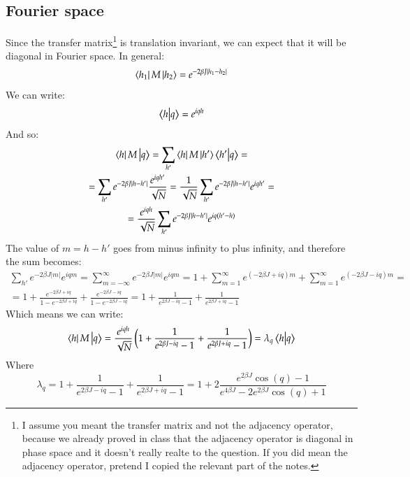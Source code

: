 \documentclass{article}
\begin{document}
\subsection{Fourier space}
Since the transfer matrix\footnote{I assume you meant the transfer matrix and not the adjacency operator, because we already proved in class that the adjacency operator is diagonal in phase space and it doesn't really realte to the question. If you did mean the adjacency operator, pretend I copied the relevant part of the notes.} is translation invariant, we can expect that it will be diagonal in Fourier space. In general:
\begin{equation}
    \bra{h_1}M\ket{h_2} = e^{-2\beta J|h_1 - h_2|}
\end{equation}
We can write:
\begin{equation}
    \bra{h}\ket{q} = e^{iqh}
\end{equation}
And so:
\begin{equation}
\begin{gathered}
    \bra{h}M\ket{q}
    = \sum_{h'} \bra{h}M\ket{h'}\bra{h'}\ket{q} = \\
    = \sum_{h'} e^{-2\beta J|h - h'|}\frac{e^{iqh'}}{\sqrt{N}}
    = \frac{1}{\sqrt{N}}\sum_{h'} e^{-2\beta J|h - h'|}e^{iqh'} = \\
    = \frac{e^{iqh}}{\sqrt{N}}\sum_{h'} e^{-2\beta J|h - h'|} e^{iq(h'-h)}
\end{gathered}
\end{equation}
The value of $m = h - h'$ goes from minus infinity to plus infinity, and therefore the sum becomes:
\begin{equation}
\begin{gathered}
    \sum_{h'} e^{-2\beta J|m|} e^{iqm} = \sum_{m=-\infty}^\infty e^{-2\beta J|m|} e^{iqm} = 1 + \sum_{m = 1}^{\infty}e^{(-2\beta J + iq)m} + \sum_{m = 1}^{\infty}e^{(-2\beta J - iq)m} = \\
    = 1 + \frac{e^{-2\beta J + iq}}{1 - e^{-2\beta J + iq}} + \frac{e^{-2\beta J - iq}}{1 - e^{-2\beta J - iq}} = 1 + \frac{1}{e^{2\beta J - iq} - 1} + \frac{1}{e^{2\beta J + iq} - 1}
\end{gathered}
\end{equation}
Which means we can write:
\begin{equation}
    \bra{h}M\ket{q} = \frac{e^{iqh}}{\sqrt{N}}\left(1 + \frac{1}{e^{2\beta J - iq} - 1} + \frac{1}{e^{2\beta J + iq} - 1}\right) = \lambda_{q}\bra{h}\ket{q}
\end{equation}
Where
\begin{equation}
    \lambda_q = 1 + \frac{1}{e^{2\beta J - iq} - 1} + \frac{1}{e^{2\beta J + iq} - 1} = 1 + 2\frac{e^{2\beta J}\cos(q) - 1}{e^{4\beta J} - 2e^{2\beta J}\cos(q) + 1}
\end{equation}
\end{document}
